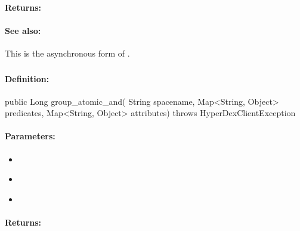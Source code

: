 \paragraph{Returns:}


\paragraph{See also:}  This is the asynchronous form of .

\pagebreak
\subsubsection{}
\label{api:java:group_atomic_and}


\paragraph{Definition:}
\begin{javacode}
public Long group_atomic_and(
        String spacename,
        Map<String, Object> predicates,
        Map<String, Object> attributes) throws HyperDexClientException
\end{javacode}

\paragraph{Parameters:}
\begin{itemize}[noitemsep]
\item {}\\

\item {}\\

\item {}\\

\end{itemize}

\paragraph{Returns:}


